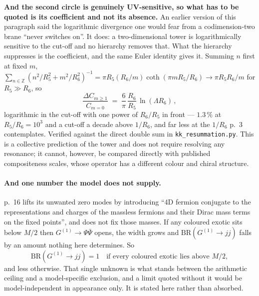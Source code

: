 \documentclass[11pt,a4paper]{article}
\newcommand{\ZZ}{\mathbb{Z}}
\begin{document}
\noindent\textbf{And the second circle is genuinely UV-sensitive, so what has to be quoted is its
coefficient and not its absence.} An earlier version of this paragraph said the logarithmic
divergence one would fear from a codimension-two brane ``never switches on''. It does: a
two-dimensional tower is logarithmically sensitive to the cut-off and no hierarchy removes that.
What the hierarchy suppresses is the coefficient, and the same Euler identity gives it. Summing
$n$ first at fixed $m$, $\sum_{n\in\ZZ}(n^2/R_5^2+m^2/R_6^2)^{-1}=\pi R_5(R_6/m)\coth(\pi
mR_5/R_6)\to\pi R_5R_6/m$ for $R_5\gg R_6$, so
\begin{equation}\label{eq:codim2}
  \frac{\Delta C_{m\ge1}}{C_{m=0}}\;=\;\frac{6}{\pi}\,\frac{R_6}{R_5}\,\ln(\Lambda R_6)\,,
\end{equation}
logarithmic in the cut-off with one power of $R_6/R_5$ in front --- $1.3\,\%$ at $R_5/R_6=10^3$
and a cut-off a decade above $1/R_6$, and far less at the $1/R_6$ \cite{KM25} p.~3 contemplates.
Verified against the direct double sum in \texttt{kk\_\allowbreak resummation.py}. This is a collective prediction of
the tower and does not require resolving any resonance; it cannot, however, be compared directly
with published compositeness scales, whose operator has a different colour and chiral structure.

\paragraph{And one number the model does not supply.} \cite{KM25} p.~16 lifts its unwanted zero
modes by introducing ``4D fermion conjugate to the representations and charges of the massless
fermions and their Dirac mass terms on the fixed points'', and does not fix those masses. If any
coloured exotic sits below $M/2$ then $G^{(1)}\to\Psi\bar\Psi$ opens, the width grows and
$\mathrm{BR}(G^{(1)}\to jj)$ falls by an amount nothing here determines. So
\begin{equation}\label{eq:brhole}
  \mathrm{BR}(G^{(1)}\to jj)=1 \quad\text{if every coloured exotic lies above } M/2,
\end{equation}
and less otherwise. That single unknown is what stands between the arithmetic ceiling and a
model-specific exclusion, and a limit quoted without it would be model-independent in appearance
only. It is stated here rather than absorbed.
\end{document}
